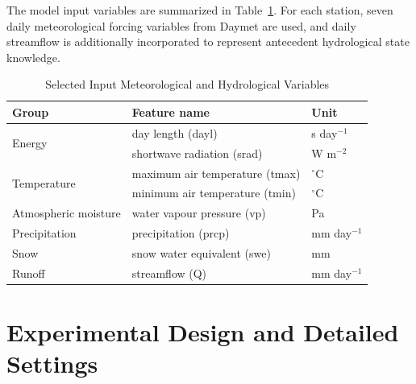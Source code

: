 \documentclass[11pt]{article}
\begin{document}
The model input variables are summarized in Table~\ref{tab:input_features}. For each station, seven daily meteorological forcing variables from Daymet are used, and daily streamflow is additionally incorporated to represent antecedent hydrological state knowledge.

\begin{table}[htbp]
	\centering
	\caption{Selected Input Meteorological and Hydrological Variables}
	\label{tab:input_features}
	\begin{tabular*}{\textwidth}{@{\extracolsep{\fill}}lll}
		\toprule
		Group & Feature name & Unit \\
		\midrule
		\multirow{2}{*}{Energy} & day length (dayl) & s day$^{-1}$ \\
		& shortwave radiation (srad) & W m$^{-2}$ \\
		\multirow{2}{*}{Temperature} & maximum air temperature (tmax) & $^\circ$C \\
		& minimum air temperature (tmin) & $^\circ$C \\
		Atmospheric moisture & water vapour pressure (vp) & Pa \\
		Precipitation & precipitation (prcp) & mm day$^{-1}$ \\
		Snow & snow water equivalent (swe) & mm \\
		Runoff & streamflow (Q) & mm day$^{-1}$ \\
		\bottomrule
	\end{tabular*}
\end{table}

\section{Experimental Design and Detailed Settings}
\end{document}
